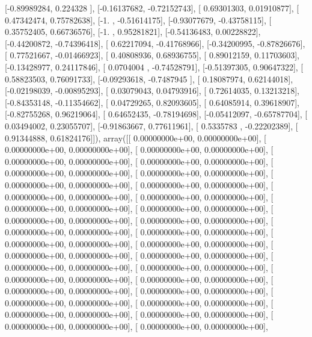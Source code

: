 \documentclass{article}
\begin{document}
       [-0.89989284,  0.224328  ],
       [-0.16137682, -0.72152743],
       [ 0.69301303,  0.01910877],
       [ 0.47342474,  0.75782638],
       [-1.        , -0.51614175],
       [-0.93077679, -0.43758115],
       [ 0.35752405,  0.66736576],
       [-1.        ,  0.95281821],
       [-0.54136483,  0.00228822],
       [-0.44200872, -0.74396418],
       [ 0.62217094, -0.41768966],
       [-0.34200995, -0.87826676],
       [ 0.77521667, -0.01466923],
       [ 0.40808936,  0.68936755],
       [ 0.89012159,  0.11703603],
       [-0.13428977,  0.24117846],
       [ 0.0704004 , -0.74528791],
       [-0.51397305,  0.90647322],
       [ 0.58823503,  0.76091733],
       [-0.09293618, -0.7487945 ],
       [ 0.18087974,  0.62144018],
       [-0.02198039, -0.00895293],
       [ 0.03079043,  0.04793916],
       [ 0.72614035,  0.13213218],
       [-0.84353148, -0.11354662],
       [ 0.04729265,  0.82093605],
       [ 0.64085914,  0.39618907],
       [-0.82755268,  0.96219064],
       [ 0.64652435, -0.78194698],
       [-0.05412097, -0.65787704],
       [ 0.03494002,  0.23055707],
       [-0.91863667,  0.77611961],
       [ 0.5335783 , -0.22202389],
       [ 0.91344888,  0.61824176]]), array([[ 0.00000000e+00,  0.00000000e+00],
       [ 0.00000000e+00,  0.00000000e+00],
       [ 0.00000000e+00,  0.00000000e+00],
       [ 0.00000000e+00,  0.00000000e+00],
       [ 0.00000000e+00,  0.00000000e+00],
       [ 0.00000000e+00,  0.00000000e+00],
       [ 0.00000000e+00,  0.00000000e+00],
       [ 0.00000000e+00,  0.00000000e+00],
       [ 0.00000000e+00,  0.00000000e+00],
       [ 0.00000000e+00,  0.00000000e+00],
       [ 0.00000000e+00,  0.00000000e+00],
       [ 0.00000000e+00,  0.00000000e+00],
       [ 0.00000000e+00,  0.00000000e+00],
       [ 0.00000000e+00,  0.00000000e+00],
       [ 0.00000000e+00,  0.00000000e+00],
       [ 0.00000000e+00,  0.00000000e+00],
       [ 0.00000000e+00,  0.00000000e+00],
       [ 0.00000000e+00,  0.00000000e+00],
       [ 0.00000000e+00,  0.00000000e+00],
       [ 0.00000000e+00,  0.00000000e+00],
       [ 0.00000000e+00,  0.00000000e+00],
       [ 0.00000000e+00,  0.00000000e+00],
       [ 0.00000000e+00,  0.00000000e+00],
       [ 0.00000000e+00,  0.00000000e+00],
       [ 0.00000000e+00,  0.00000000e+00],
       [ 0.00000000e+00,  0.00000000e+00],
       [ 0.00000000e+00,  0.00000000e+00],
       [ 0.00000000e+00,  0.00000000e+00],
       [ 0.00000000e+00,  0.00000000e+00],
       [ 0.00000000e+00,  0.00000000e+00],
       [ 0.00000000e+00,  0.00000000e+00],
       [ 0.00000000e+00,  0.00000000e+00],
       [ 0.00000000e+00,  0.00000000e+00],
\end{document}
